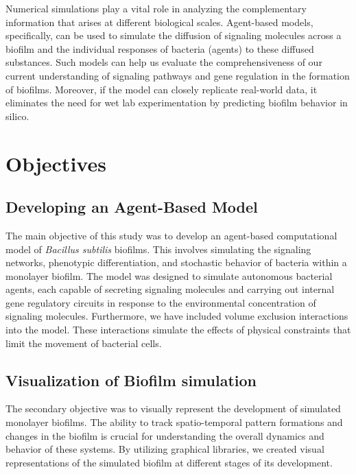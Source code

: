 Numerical simulations play a vital role in analyzing the complementary information that arises at different biological scales. Agent-based models, specifically, can be used to simulate the diffusion of signaling molecules across a biofilm and the individual responses of bacteria (agents) to these diffused substances. Such models can help us evaluate the comprehensiveness of our current understanding of signaling pathways and gene regulation in the formation of biofilms. Moreover, if the model can closely replicate real-world data, it eliminates the need for wet lab experimentation by predicting biofilm behavior in silico.{\footnotesize\cite{Nagarajan2022}}

\section{Objectives}
\subsection{Developing an Agent-Based Model}
The main objective of this study was to develop an agent-based computational model of \textit{Bacillus subtilis} biofilms. This involves simulating the signaling networks, phenotypic differentiation, and stochastic behavior of bacteria within a monolayer biofilm. The model was designed to simulate autonomous bacterial agents, each capable of secreting signaling molecules and carrying out internal gene regulatory circuits in response to the environmental concentration of signaling molecules. Furthermore, we have included volume exclusion interactions into the model. These interactions simulate the effects of physical constraints that limit the movement of bacterial cells.
\subsection{Visualization of Biofilm simulation}
The secondary objective was to visually represent the development of simulated monolayer biofilms. The ability to track spatio-temporal pattern formations and changes in the biofilm is crucial for understanding the overall dynamics and behavior of these systems. By utilizing graphical libraries, we created visual representations of the simulated biofilm at different stages of its development.

